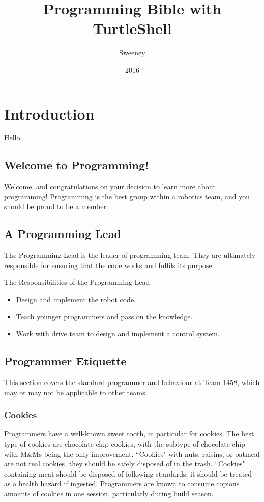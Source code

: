 \documentclass[]{report}
\title{Programming Bible with TurtleShell}
\author{Sweeney}
\date{2016}
\begin{document}
\newcommand{\ITwoC}{I$^{2}$C}
\newcommand{\trademark}{$^{TM}$}
\newcommand{\goodcopyright}{$^{\copyright}$}
\newcommand{\pokemon}{Pok\'emon}
\newcommand{\ilc}[1]{\texttt{#1}}%
\maketitle

\tableofcontents

\chapter{Introduction}
Hello.

\section{Welcome to Programming!}
Welcome, and congratulations on your decision to learn more about programming!
Programming is the best group within a robotics team, and you should be proud to be a member.

\section{A Programming Lead}
The Programming Lead is the leader of programming team.
They are ultimately responsible for ensuring that the code works and fulfils its purpose.

The Responsibilities of the Programming Lead
\begin{itemize}
\item Design and implement the robot code.
\item Teach younger programmers and pass on the knowledge.
\item Work with drive team to design and implement a control system.
\end{itemize}

\section{Programmer Etiquette}
This section covers the standard programmer and behaviour at Team 1458, which may or may not be applicable to other teams.
\subsection{Cookies}
Programmers have a well-known sweet tooth, in particular for cookies.
The best type of cookies are chocolate chip cookies, with the subtype of chocolate chip with M\&Ms being the only improvement.
``Cookies" with nuts, raisins, or oatmeal are not real cookies, they should be safely disposed of in the trash.
``Cookies" containing meat should be disposed of following standards, it should be treated as a health hazard if ingested.
Programmers are known to consume copious amounts of cookies in one session, particularly during build season.
\end{document}
